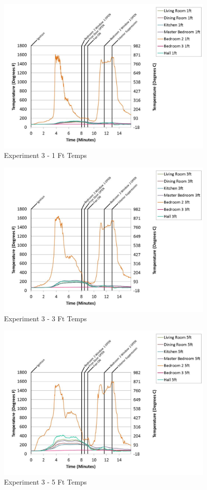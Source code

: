 \documentclass{article}
\begin{document}
\begin{appendices}
	\begin{figure}[h!]
		\centering
		\includegraphics[height=3.05in]{0_Images/Results_Charts/Exp_3_Charts/1FtTemps.pdf}
		\caption{Experiment 3 - 1 Ft Temps}
	\end{figure}
 

	\begin{figure}[h!]
		\centering
		\includegraphics[height=3.05in]{0_Images/Results_Charts/Exp_3_Charts/3FtTemps.pdf}
		\caption{Experiment 3 - 3 Ft Temps}
	\end{figure}
 
	\clearpage

	\begin{figure}[h!]
		\centering
		\includegraphics[height=3.05in]{0_Images/Results_Charts/Exp_3_Charts/5FtTemps.pdf}
		\caption{Experiment 3 - 5 Ft Temps}
	\end{figure}
 


\end{appendices}
\end{document}

